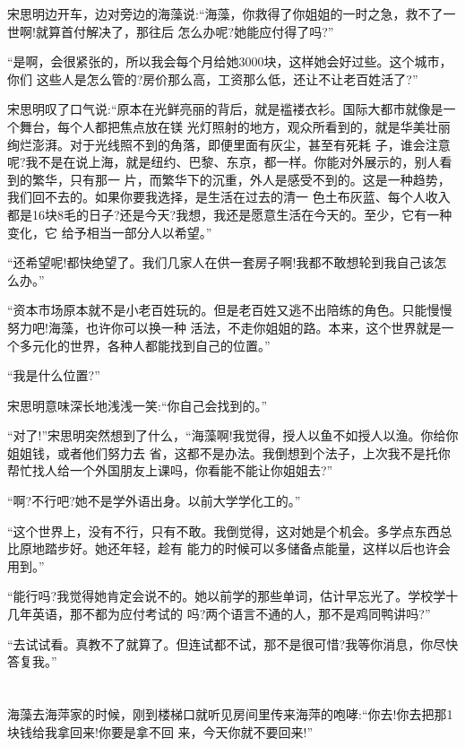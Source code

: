 \documentclass[11pt,a4paper,onecolumn]{article}
\begin{document}
宋思明边开车，边对旁边的海藻说:``海藻，你救得了你姐姐的一时之急，救不了一世啊!就算首付解决了，那往后
怎么办呢?她能应付得了吗?''

``是啊，会很紧张的，所以我会每个月给她3000块，这样她会好过些。这个城市，你们
这些人是怎么管的?房价那么高，工资那么低，还让不让老百姓活了?''

宋思明叹了口气说:``原本在光鲜亮丽的背后，就是褴褛衣衫。国际大都市就像是一个舞台，每个人都把焦点放在镁
光灯照射的地方，观众所看到的，就是华美壮丽绚烂澎湃。对于光线照不到的角落，即便里面有灰尘，甚至有死耗
子，谁会注意呢?我不是在说上海，就是纽约、巴黎、东京，都一样。你能对外展示的，别人看到的繁华，只有那一
片，而繁华下的沉重，外人是感受不到的。这是一种趋势，我们回不去的。如果你要我选择，是生活在过去的清一
色土布灰蓝、每个人收入都是16块8毛的日子?还是今天?我想，我还是愿意生活在今天的。至少，它有一种变化，它
给予相当一部分人以希望。''

``还希望呢!都快绝望了。我们几家人在供一套房子啊!我都不敢想轮到我自己该怎么办。''

``资本市场原本就不是小老百姓玩的。但是老百姓又逃不出陪练的角色。只能慢慢努力吧!海藻，也许你可以换一种
活法，不走你姐姐的路。本来，这个世界就是一个多元化的世界，各种人都能找到自己的位置。''

``我是什么位置?''

宋思明意味深长地浅浅一笑:``你自己会找到的。''

``对了!''宋思明突然想到了什么，``海藻啊!我觉得，授人以鱼不如授人以渔。你给你姐姐钱，或者他们努力去
省，这都不是办法。我倒想到个法子，上次我不是托你帮忙找人给一个外国朋友上课吗，你看能不能让你姐姐去?''

``啊?不行吧?她不是学外语出身。以前大学学化工的。''

``这个世界上，没有不行，只有不敢。我倒觉得，这对她是个机会。多学点东西总比原地踏步好。她还年轻，趁有
能力的时候可以多储备点能量，这样以后也许会用到。''

``能行吗?我觉得她肯定会说不的。她以前学的那些单词，估计早忘光了。学校学十几年英语，那不都为应付考试的
吗?两个语言不通的人，那不是鸡同鸭讲吗?''

``去试试看。真教不了就算了。但连试都不试，那不是很可惜?我等你消息，你尽快答复我。''

\section[\thesection]{}

海藻去海萍家的时候，刚到楼梯口就听见房间里传来海萍的咆哮:``你去!你去把那1块钱给我拿回来!你要是拿不回
来，今天你就不要回来!''
\end{document}
